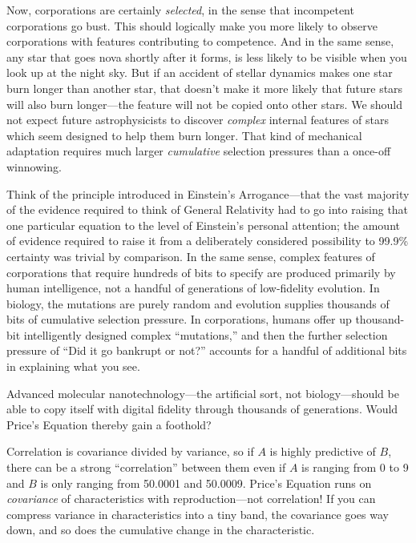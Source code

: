 {
 Now, corporations are certainly \textit{selected}, in the sense
that incompetent corporations go bust. This should logically make you
more likely to observe corporations with features contributing to
competence. And in the same sense, any star that goes nova shortly
after it forms, is less likely to be visible when you look up at the
night sky. But if an accident of stellar dynamics makes one star burn
longer than another star, that doesn't make it more
likely that future stars will also burn longer---the feature will not
be copied onto other stars. We should not expect future astrophysicists
to discover \textit{complex} internal features of stars which seem
designed to help them burn longer. That kind of mechanical adaptation
requires much larger \textit{cumulative} selection pressures than a
once-off winnowing.}

{
 Think of the principle introduced in Einstein's
Arrogance---that the vast majority of the evidence required to think of
General Relativity had to go into raising that one particular equation
to the level of Einstein's personal attention; the
amount of evidence required to raise it from a deliberately considered
possibility to 99.9\% certainty was trivial by comparison. In the same
sense, complex features of corporations that require hundreds of bits
to specify are produced primarily by human intelligence, not a handful
of generations of low-fidelity evolution. In biology, the mutations are
purely random and evolution supplies thousands of bits of cumulative
selection pressure. In corporations, humans offer up thousand-bit
intelligently designed complex
``mutations,'' and then the further
selection pressure of ``Did it go bankrupt or
not?'' accounts for a handful of additional bits in
explaining what you see.}

{
 Advanced molecular nanotechnology---the artificial sort, not
biology---should be able to copy itself with digital fidelity through
thousands of generations. Would Price's Equation
thereby gain a foothold?}

{
 Correlation is covariance divided by variance, so if $A$ is highly
predictive of $B$, there can be a strong
``correlation'' between them even if
$A$ is ranging from 0 to 9 and $B$ is only ranging from 50.0001 and
50.0009. Price's Equation runs on \textit{covariance}
of characteristics with reproduction---not correlation! If you can
compress variance in characteristics into a tiny band, the covariance
goes way down, and so does the cumulative change in the
characteristic.}

